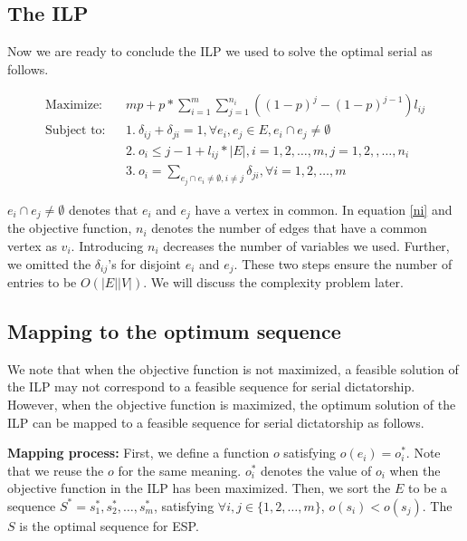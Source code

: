 \documentclass[letterpaper]{article}
\begin{document}
\subsection{The ILP}
Now we are ready to conclude the ILP we used to solve the optimal serial as follows.

\begin{eqnarray}
\text{Maximize:}&& mp+p*\sum_{i=1}^{m}\sum_{j=1}^{n_i}((1-p)^j-(1-p)^{j-1})l_{ij}\label{stobj}\\
\text{Subject to:}&& 1.~\delta_{ij}+\delta_{ji}=1, \forall e_i,e_j\in E, e_i\cap e_j\neq \emptyset \label{con1}\\
&& 2.~o_i\leq j-1+l_{ij}*|E|,  i=1,2,\ldots,m, j=1,2,,\ldots,n_i\label{ni}\\
&& 3.~o_i=\sum_{e_j\cap e_i\neq \emptyset,i\neq j}\delta_{ji}, \forall i=1,2,\ldots,m \label{oo}
\end{eqnarray}

 $e_i\cap e_j\neq \emptyset$ denotes that $e_i$ and $e_j$ have a vertex in common. 
In equation \ref{ni} and the objective function, $n_i$ denotes the number of edges that have a common vertex as $v_i$.
Introducing $n_i$ decreases the number of variables we used.
Further, we omitted the $\delta_{ij}$'s for disjoint $e_i$ and $e_j$.
These two steps ensure the number of entries to be $O(|E||V|)$.
We will discuss the complexity problem later.

\subsection{Mapping to the optimum sequence}
We note that when the objective function is not maximized, a feasible solution of the ILP may not correspond to a feasible sequence for serial dictatorship.
However, when the objective function is maximized, the optimum solution of the ILP can be mapped to a feasible sequence for serial dictatorship as follows.

\textbf{Mapping process: }First, we define a function $o$ satisfying $o(e_i)=o_i^*$. 
Note that we reuse the $o$ for the same meaning.
$o_i^*$ denotes the value of $o_i$ when the objective function in the ILP has been maximized.
Then, we sort the $E$ to be a sequence $S^*=s_1^*,s_2^*,\ldots,s_m^*$, satisfying $\forall i,j\in\{1,2,\ldots,m\}$, $o(s_i)<o(s_j)$.
The $S$ is the optimal sequence for ESP.
\end{document}
